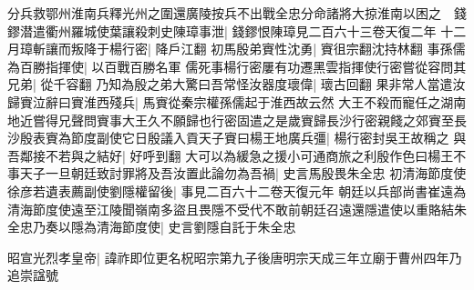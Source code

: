 分兵救鄂州淮南兵釋光州之圍還廣陵按兵不出戰全忠分命諸將大掠淮南以困之　錢鏐潜遣衢州羅城使葉讓殺刺史陳璋事泄|{
	錢鏐恨陳璋見二百六十三卷天復二年}
十二月璋斬讓而叛降于楊行密|{
	降戶江翻}
初馬殷弟賨性沈勇|{
	賨徂宗翻沈持林翻}
事孫儒為百勝指揮使|{
	以百戰百勝名軍}
儒死事楊行密屢有功遷黑雲指揮使行密嘗從容問其兄弟|{
	從千容翻}
乃知為殷之弟大驚曰吾常怪汝器度瓌偉|{
	瓌古回翻}
果非常人當遣汝歸賨泣辭曰賨淮西殘兵|{
	馬賨從秦宗權孫儒起于淮西故云然}
大王不殺而寵任之湖南地近嘗得兄聲問賨事大王久不願歸也行密固遣之是歲賨歸長沙行密親餞之郊賨至長沙殷表賨為節度副使它日殷議入貢天子賨曰楊王地廣兵彊|{
	楊行密封吳王故稱之}
與吾鄰接不若與之結好|{
	好呼到翻}
大可以為緩急之援小可通商旅之利殷作色曰楊王不事天子一旦朝廷致討罪將及吾汝置此論勿為吾禍|{
	史言馬殷畏朱全忠}
初清海節度使徐彦若遺表薦副使劉隱權留後|{
	事見二百六十二卷天復元年}
朝廷以兵部尚書崔遠為清海節度使遠至江陵聞嶺南多盜且畏隱不受代不敢前朝廷召遠還隱遣使以重賂結朱全忠乃奏以隱為清海節度使|{
	史言劉隱自託于朱全忠}


昭宣光烈孝皇帝|{
	諱祚即位更名柷昭宗第九子後唐明宗天成三年立廟于曹州四年乃追崇諡號}


